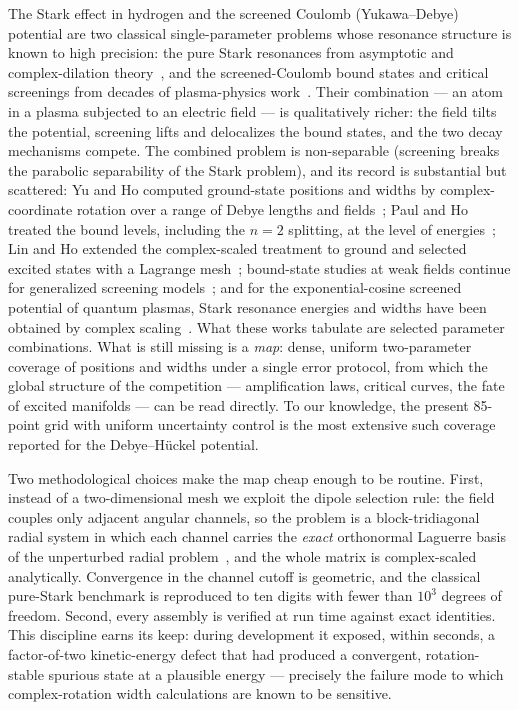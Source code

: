 \documentclass[aps,pra,twocolumn,superscriptaddress,floatfix,longbibliography]{revtex4-2}
\begin{document}
The Stark effect in hydrogen and the screened Coulomb (Yukawa--Debye)
potential are two classical single-parameter problems whose resonance
structure is known to high precision: the pure Stark resonances from
asymptotic and complex-dilation
theory~\cite{DamburgKolosov1976,Herbst1979,Kolosov1987,Telnov1989,
Jentschura2001}, and the screened-Coulomb bound states and critical
screenings from decades of plasma-physics
work~\cite{LamVarshni1971,RogersGraboskeHarwood1970,delValleNader2018,
JanevZhangWang2016}. Their combination --- an atom in a plasma
subjected to an electric field --- is qualitatively richer: the field
tilts the potential, screening lifts and delocalizes the bound states,
and the two decay mechanisms compete. The combined problem is
non-separable (screening breaks the parabolic separability of the
Stark problem), and its record is substantial but scattered: Yu and
Ho computed ground-state positions and widths by complex-coordinate
rotation over a range of Debye lengths and fields~\cite{YuHo2005};
Paul and Ho treated the bound levels, including the $n=2$ splitting,
at the level of energies~\cite{PaulHo2010}; Lin and Ho extended the
complex-scaled treatment to ground and selected excited states with a
Lagrange mesh~\cite{LinHo2011}; bound-state studies at weak fields
continue for generalized screening models~\cite{BaharSoylu2014,
DasGhoshal2025}; and for the exponential-cosine screened potential of
quantum plasmas, Stark resonance energies and widths have been
obtained by complex scaling~\cite{WangChenGuo2019}. What these works
tabulate are selected parameter combinations. What is still missing
is a \emph{map}: dense, uniform two-parameter coverage of positions
and widths under a single error protocol, from which the global
structure of the competition --- amplification laws, critical curves,
the fate of excited manifolds --- can be read directly. To our
knowledge, the present 85-point grid with uniform uncertainty control
is the most extensive such coverage reported for the Debye--H\"uckel
potential.

Two methodological choices make the map cheap enough to be routine.
First, instead of a two-dimensional mesh we exploit the dipole
selection rule: the field couples only adjacent angular channels, so
the problem is a block-tridiagonal radial system in which each channel
carries the \emph{exact} orthonormal Laguerre basis of the
unperturbed radial problem~\cite{companionNR}, and the whole matrix is
complex-scaled analytically. Convergence in the channel cutoff is
geometric, and the classical pure-Stark benchmark is reproduced to ten
digits with fewer than $10^{3}$ degrees of freedom. Second, every
assembly is verified at run time against exact identities. This
discipline earns its keep: during development it exposed, within
seconds, a factor-of-two kinetic-energy defect that had produced a
convergent, rotation-stable spurious state at a plausible energy ---
precisely the failure mode to which complex-rotation width
calculations are known to be sensitive.
\end{document}
